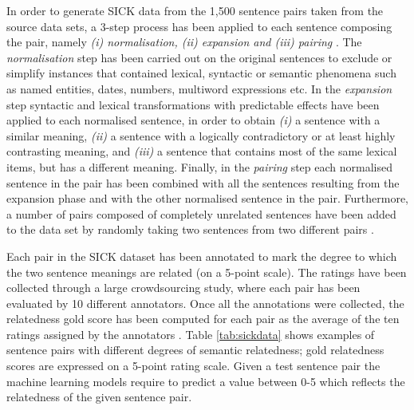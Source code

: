 \begin{enumerate}
  In order to generate SICK data from the 1,500 sentence pairs taken from the source data sets, a 3-step process has been applied to each sentence composing the pair, namely \textit{(i) normalisation, (ii) expansion and (iii) pairing} \cite{marelli-etal-2014-semeval}. The \textit{normalisation} step has been carried out on the original sentences to exclude or simplify instances that contained lexical, syntactic or semantic phenomena such as named entities, dates, numbers, multiword expressions etc. In the \textit{expansion} step syntactic and lexical transformations with predictable effects have been applied to each normalised sentence, in
  order to obtain \textit{(i)} a sentence with a similar meaning, \textit{(ii)} a sentence with a logically contradictory or at least highly contrasting meaning, and \textit{(iii)} a sentence that contains most of the same lexical items, but has a different meaning. Finally, in the \textit{pairing} step each normalised sentence in the pair has been combined with all the sentences resulting from the expansion phase and with the other normalised sentence in the pair. Furthermore, a number of pairs composed of completely unrelated sentences have been added to the data set by randomly taking two sentences from two different pairs \cite{marelli-etal-2014-semeval}. 
  
  Each pair in the SICK dataset has been annotated to mark the degree to which the two sentence meanings are related (on a 5-point scale). The ratings 
  have been collected through a large crowdsourcing study, where each pair 
  has been evaluated by 10 different annotators. Once all the annotations were collected, the relatedness gold score has been computed for each pair as the average of the ten ratings assigned by the annotators \cite{marelli-etal-2014-semeval}. Table \ref{tab:sickdata} shows examples of sentence pairs with different degrees of semantic relatedness; gold relatedness scores are expressed on a 5-point rating scale. Given a test sentence pair the machine learning models require to predict a value between 0-5 which reflects the relatedness of the given sentence pair. 
  

\end{enumerate}
